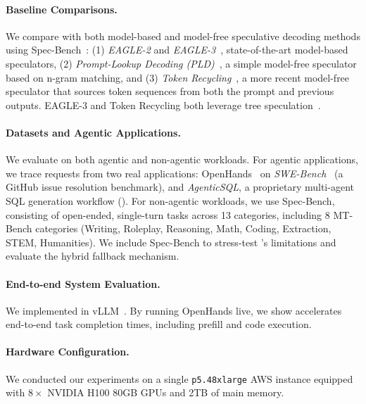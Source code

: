 \paragraph{Baseline Comparisons.}
We compare with both model-based and model-free speculative decoding methods using Spec-Bench~\citep{xia2024unlockingefficiencylargelanguage}: (1) \emph{EAGLE-2} and \emph{EAGLE-3}~\citep{li2025eagle3scalinginferenceacceleration}, state-of-the-art model-based speculators, (2) \emph{Prompt-Lookup Decoding (PLD)}~\citep{saxena2023prompt}, a simple model-free speculator based on n-gram matching, and (3) \emph{Token Recycling}~\citep{luo2024turningtrashtreasureaccelerating}, a more recent model-free speculator that sources token sequences from both the prompt and previous outputs. EAGLE-3 and Token Recycling both leverage tree speculation~\citep{specinfer}.

\paragraph{Datasets and Agentic Applications.}
We evaluate on both agentic and non-agentic workloads. For agentic applications, we trace requests from two real applications: OpenHands~\citep{openhands} on \emph{SWE-Bench}~\citep{jimenez2024swebenchlanguagemodelsresolve} (a GitHub issue resolution benchmark), and \emph{AgenticSQL}, a proprietary multi-agent SQL generation workflow (). For non-agentic workloads, we use Spec-Bench, consisting of open-ended, single-turn tasks across 13 categories, including 8 MT-Bench categories (Writing, Roleplay, Reasoning, Math, Coding, Extraction, STEM, Humanities). We include Spec-Bench to stress-test \SuffixDecoding's limitations and evaluate the hybrid fallback mechanism.

\paragraph{End-to-end System Evaluation.} We implemented \SuffixDecoding in vLLM~\citep{vllm}. By running OpenHands live, we show \SuffixDecoding accelerates end-to-end task completion times, including prefill and code execution.

\paragraph{Hardware Configuration.}
We conducted our experiments on a single \texttt{p5.48xlarge} AWS instance equipped with \( 8\times \) NVIDIA H100 80GB GPUs and 2TB of main memory.

